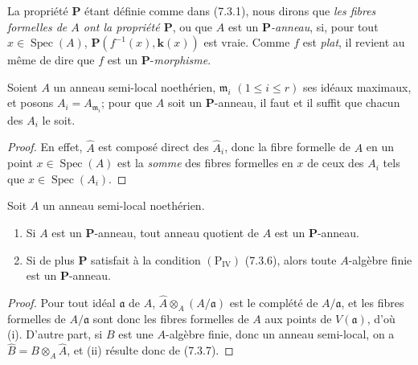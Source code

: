 
La propriété $\boldsymbol P$ étant définie comme dans (7.3.1), nous dirons
que \emph{les fibres formelles de $A$ ont la propriété $\boldsymbol P$},
ou que $A$ est un \emph{$\boldsymbol P$-anneau}, si, pour tout
$x\in\operatorname{Spec}(A)$,
$\boldsymbol P(f^{-1}(x),\boldsymbol{k}(x))$ est vraie. Comme $f$ est \emph{plat}, il
revient au même de dire que $f$ est un $\boldsymbol P$-\emph{morphisme}.

\begin{proposition}[7.3.14]
\label{IV.2.s7.3.14-fr}
Soient $A$ un anneau semi-local noethérien,
$\mathfrak m_i$ $(1\leqslant i\leqslant r)$ ses idéaux maximaux, et posons
$A_i=A_{\mathfrak m_i}$; pour que $A$ soit un $\boldsymbol P$-anneau, il
faut et il suffit que chacun des $A_i$ le soit.
\end{proposition}

\begin{proof}
En effet, $\widehat A$ est composé direct des $\widehat A_i$, donc la
fibre formelle de $A$ en un point $x\in\operatorname{Spec}(A)$ est la
\emph{somme} des fibres formelles en $x$ de ceux des $A_i$ tels que
$x\in\operatorname{Spec}(A_i)$.
\end{proof}

\begin{proposition}[7.3.15]
\label{IV.2.s7.3.15-fr}
Soit $A$ un anneau semi-local noethérien.
\begin{enumerate}
\item[\textup{(i)}] Si $A$ est un $\boldsymbol P$-anneau, tout anneau quotient de $A$
est un $\boldsymbol P$-anneau.
\item[\textup{(ii)}] Si de plus $\boldsymbol P$ satisfait à la condition
$(\mathrm P_{\mathrm{IV}})$ \textup{(7.3.6)}, alors toute $A$-algèbre finie est un
$\boldsymbol P$-anneau.
\end{enumerate}
\end{proposition}

\begin{proof}
Pour tout idéal $\mathfrak a$ de $A$,
$\widehat A\otimes_A(A/\mathfrak a)$ est le complété de
$A/\mathfrak a$, et les fibres formelles de $A/\mathfrak a$ sont donc les
fibres formelles de $A$ aux points de $V(\mathfrak a)$, d'où (i). D'autre
part, si $B$ est une $A$-algèbre finie, donc un anneau semi-local, on a
$\widehat B=B\otimes_A\widehat A$, et (ii) résulte donc de (7.3.7).
\end{proof}

